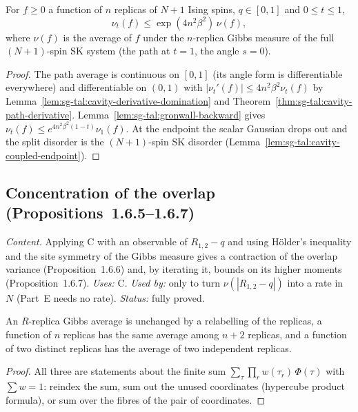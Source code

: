\begin{theorem}
\label{thm:sg-tal:cavity-domination}
  \leanok
{}
For $f\ge0$ a function of $n$ replicas of $N+1$ Ising spins, $q\in[0,1]$ and $0\le t\le1$,
\[
\nu_t(f)\le\exp(4n^2\beta^2)\,\nu(f),
\]
where $\nu(f)$ is the average of $f$ under the $n$-replica Gibbs measure of the full
$(N+1)$-spin SK system (the path at $t=1$, the angle $s=0$).
\end{theorem}
\begin{proof}
  \leanok
The path average is continuous on $[0,1]$ (its angle form is differentiable everywhere) and
differentiable on $(0,1)$ with $|\nu_t'(f)|\le4n^2\beta^2\nu_t(f)$ by
Lemma~\ref{lem:sg-tal:cavity-derivative-domination} and
Theorem~\ref{thm:sg-tal:cavity-path-derivative}. Lemma~\ref{lem:sg-tal:gronwall-backward} gives
$\nu_t(f)\le e^{4n^2\beta^2(1-t)}\nu_1(f)$. At the endpoint the scalar Gaussian drops out and the
split disorder is the $(N+1)$-spin SK disorder (Lemma~\ref{lem:sg-tal:cavity-coupled-endpoint}).
\end{proof}

\subsection{Concentration of the overlap (Propositions~1.6.5--1.6.7)}
\label{sec:sg-tal:cavity-overlap}

\emph{Content.} Applying C with an observable of $R_{1,2}-q$ and using H\"older's inequality and the
site symmetry of the Gibbs measure gives a contraction of the overlap variance
(Proposition~1.6.6) and, by iterating it, bounds on its higher moments (Proposition~1.6.7).
\emph{Uses:} C.  \emph{Used by:} only to turn $\nu(|R_{1,2}-q|)$ into a rate in $N$ (Part~E needs
no rate).  \emph{Status:} fully proved.

\begin{lemma}
\label{lem:sg-tal:replica-marginal}
  \leanok
{}
An $R$-replica Gibbs average is unchanged by a relabelling of the replicas, a function of $n$ replicas
has the same average among $n+2$ replicas, and a function of two distinct replicas has the average of two
independent replicas.
\end{lemma}
\begin{proof}
  \leanok
All three are statements about the finite sum $\sum_\tau\prod_r w(\tau_r)\,\Phi(\tau)$ with $\sum w=1$:
reindex the sum, sum out the unused coordinates (hypercube product formula), or sum over the fibres of the
pair of coordinates.
\end{proof}

